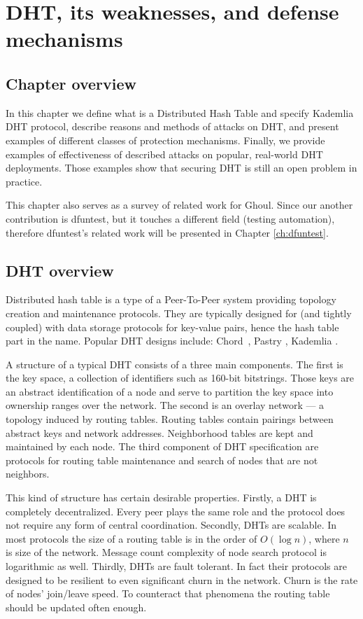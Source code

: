 \chapter{DHT, its weaknesses, and defense mechanisms}
\label{ch:threats}
\section{Chapter overview}
  In this chapter we define what is a Distributed Hash Table and specify
  Kademlia DHT protocol, describe reasons and methods of attacks on DHT, and
  present examples of different classes of protection mechanisms.
  Finally, we provide examples of effectiveness of described attacks on popular,
  real-world DHT deployments.
  Those examples show that securing DHT is still an open problem in practice.

  This chapter also serves as a survey of related work for Ghoul.
  Since our another contribution is dfuntest, but it touches a different field 
  (testing automation), therefore dfuntest's related work will be presented in
  Chapter \ref{ch:dfuntest}.

\section{DHT overview}

  Distributed hash table is a type of a Peer-To-Peer system providing topology
  creation and maintenance protocols.
  They are typically designed for (and tightly coupled) with data storage
  protocols for key-value pairs, hence the hash table part in the name.
  Popular DHT designs include: Chord~\cite{sto03}, Pastry \cite{row01}, Kademlia
  \cite{may02}.

  A structure of a typical DHT consists of a three main components. The first is
  the key space, a collection of identifiers such as 160-bit bitstrings.
  Those keys are an abstract identification of a node and serve to partition the
  key space into ownership ranges over the network.
  The second is an overlay network --- a topology induced by routing tables.
  Routing tables contain pairings between abstract keys and network addresses.
  Neighborhood tables are kept and maintained by each node.
  The third component of DHT specification are protocols for routing table
  maintenance and search of nodes that are not neighbors.

  This kind of structure has certain desirable properties. Firstly, a DHT is
  completely decentralized. Every peer plays the same role and the protocol does
  not require any form of central coordination.
  Secondly, DHTs are scalable.
  In most protocols the size of a routing table is in the order of $O(\log n)$,
  where $n$ is size of the network. Message count complexity of node search
  protocol is logarithmic as well. Thirdly, DHTs are fault tolerant. In fact
  their protocols are designed to be resilient to even significant churn in the
  network. Churn is the rate of nodes' join/leave speed. To counteract that
  phenomena the routing table should be updated often enough.
 

